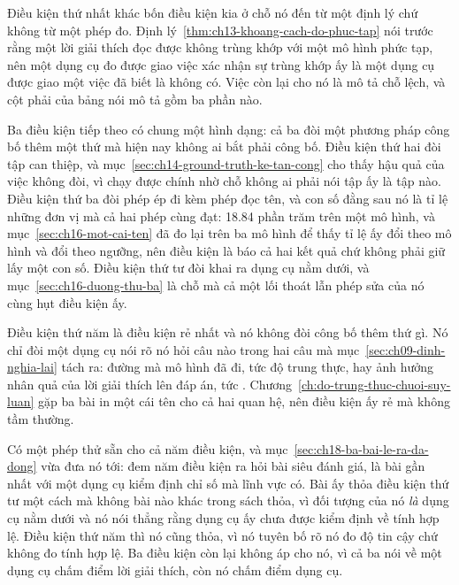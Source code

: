 %
Điều kiện thứ nhất khác bốn điều kiện kia ở chỗ nó đến từ một định lý chứ không
từ một phép đo. Định lý~\ref{thm:ch13-khoang-cach-do-phuc-tap} nói trước rằng một
lời giải thích đọc được không trùng khớp với một mô hình phức tạp, nên một dụng cụ
đo được giao việc xác nhận sự trùng khớp ấy là một dụng cụ được giao một việc đã
biết là không có. Việc còn lại cho nó là mô tả chỗ lệch, và cột phải của
bảng nói mô tả gồm ba phần nào.

Ba điều kiện tiếp theo có chung một hình dạng: cả ba đòi một phương pháp công bố
thêm một thứ mà hiện nay không ai bắt phải công bố. Điều kiện thứ hai đòi tập can
thiệp, và mục~\ref{sec:ch14-ground-truth-ke-tan-cong} cho thấy hậu quả của việc
không đòi, vì  chạy được chính nhờ chỗ không ai
phải nói tập ấy là tập nào. Điều kiện thứ ba đòi phép ép đi kèm phép đọc tên, và con số đằng sau nó là tỉ lệ
những đơn vị mà cả hai phép cùng đạt: 18.84 phần trăm trên một mô hình, và
mục~\ref{sec:ch16-mot-cai-ten} đã đo lại trên ba mô hình để thấy tỉ lệ ấy đổi
theo mô hình và đổi theo ngưỡng, nên điều kiện là báo cả hai kết quả chứ không
phải giữ lấy một con số. Điều kiện thứ tư đòi khai ra dụng cụ nằm dưới, và
mục~\ref{sec:ch16-duong-thu-ba} là chỗ mà cả một lối thoát lẫn phép sửa của nó
cùng hụt điều kiện ấy.

%
Điều kiện thứ năm là điều kiện rẻ nhất và nó không đòi công bố thêm thứ gì. Nó
chỉ đòi một dụng cụ nói rõ nó hỏi câu nào trong hai câu mà
mục~\ref{sec:ch09-dinh-nghia-lai} tách ra: đường mà mô hình đã đi, tức độ trung
thực, hay ảnh hưởng nhân quả của lời giải thích lên đáp án, tức
.
Chương~\ref{ch:do-trung-thuc-chuoi-suy-luan} gặp ba bài in một cái tên cho cả hai
quan hệ, nên điều kiện ấy rẻ mà không tầm thường.

%
Có một phép thử sẵn cho cả năm điều kiện, và mục~\ref{sec:ch18-ba-bai-le-ra-da-dong}
vừa đưa nó tới: đem năm điều kiện ra hỏi bài siêu đánh giá, là bài gần nhất với
một dụng cụ kiểm định chỉ số mà lĩnh vực có. Bài ấy thỏa điều kiện thứ tư một
cách mà không bài nào khác trong sách thỏa, vì đối tượng của nó \emph{là} dụng cụ
nằm dưới và nó nói thẳng rằng dụng cụ ấy chưa được kiểm định về tính hợp lệ. Điều
kiện thứ năm thì nó cũng thỏa, vì nó tuyên bố rõ nó đo độ tin cậy chứ không đo
tính hợp lệ. Ba điều kiện còn lại không áp cho nó, vì cả ba nói về một dụng cụ
chấm điểm lời giải thích, còn nó chấm điểm dụng cụ.

